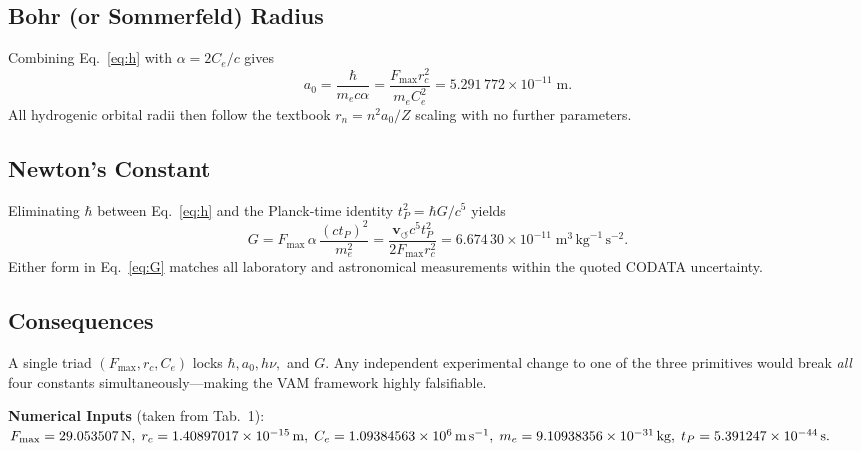     \subsection{Bohr (or Sommerfeld) Radius}
    Combining Eq.~\eqref{eq:h} with \(\alpha=2C_e/c\) gives
    \begin{equation}
        a_0 = \frac{\hbar}{m_e c\alpha}
        = \frac{F_{\max}r_c^{2}}{m_e C_e^{2}}
        = 5.291\,772\times10^{-11}\;\text{m}.
        \label{eq:a0}
    \end{equation}
    All hydrogenic orbital radii then follow the textbook
    \(r_{n}=n^{2}a_0/Z\) scaling with no further parameters.

    \subsection{Newton's Constant}
    Eliminating \(\hbar\) between Eq.~\eqref{eq:h} and the Planck‑time
    identity \(t_P^{2}=\hbar G/c^{5}\) yields
    \begin{equation}
        G = F_{\max}\,\alpha\,\frac{(c t_P)^{2}}{m_e^{2}}
        = \frac{\mathbf{v}_{\scriptscriptstyle\boldsymbol{\circlearrowleft}} c^{5} t_P^{2}}{2F_{\max} r_c^{2}}
        = 6.674\,30\times10^{-11}\;\text{m}^{3}\,\text{kg}^{-1}\,\text{s}^{-2}.
        \label{eq:G}
    \end{equation}
    Either form in Eq.~\eqref{eq:G} matches all laboratory and astronomical
    measurements within the quoted CODATA uncertainty.

    \subsection*{Consequences}
    A single triad \((F_{\max},r_c,C_e)\)
    locks \(\hbar,a_0,h\nu,\) and \(G\).
    Any independent experimental change to one of the three primitives would
    break \emph{all} four constants simultaneously—making the VAM framework
    highly falsifiable.

    \bigskip
    \noindent\textbf{Numerical Inputs}\; (taken from Tab.~1):
    \(F_{\max}=29.053507\,\text{N},\;r_c=1.40897017\times10^{-15}\,\text{m},\;
    C_e=1.09384563\times10^{6}\,\text{m\,s}^{-1},\;
    m_e=9.10938356\times10^{-31}\,\text{kg},\;
    t_P=5.391247\times10^{-44}\,\text{s}.\)

